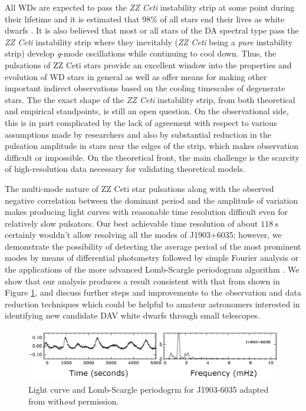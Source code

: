 \documentclass{aastex631}
\begin{document}
All WDs are expected to pass the \emph{ZZ Ceti} instability strip at
some point during their lifetime and it is estimated that 98\% of all
stars end their lives as white dwarfs \citep{Catelan_2015}. It is also
believed that most or all stars of the DA spectral type pass the
\emph{ZZ Ceti} instability strip where they inevitably (\emph{ZZ Ceti}
being a \emph{pure} instability strip) develop \emph{g}-mode
oscillations while continuing to cool down. Thus, the pulsations of ZZ
Ceti stars provide an excellent window into the properties and
evolution of WD stars in general as well as offer means for making
other important indirect observations based on the cooling timescales
of degenerate stars. The the exact shape of the \emph{ZZ Ceti}
instability strip, from both theoretical and empirical standpoints, is
still an open question. On the observational side, this is in part
complicated by the lack of agreement with respect to various
assumptions made by researchers and also by substantial reduction in
the pulsation amplitude in stars near the edges of the strip, which
makes observation difficult or impossible. On the theoretical front,
the main challenge is the scarcity of high-resolution data necessary
for validating theoretical models.

The multi-mode nature of ZZ Ceti star pulsations along with the
observed negative correlation between the dominant period and the
amplitude of variation \citep{Vincent_2020} makes producing light
curves with reasonable time resolution difficult even for relatively
slow pulsators. Our best achievable time resolution of about
\(\SI{118}{\second}\) certainly wouldn't allow resolving all the modes
of J1903+6035; however, we demonstrate the possibility of detecting
the average period of the most prominent modes by means of
differential photometry followed by simple Fourier analysis or the
applications of the more advanced Lomb-Scargle periodogram algorithm
\citep{VanderPlas_2018}. We show that our analysis produces a result
consistent with that from \citet{Vincent_2020} shown in Figure
\ref{fig:vincent}, and discuss further steps and improvements to the
observation and data reduction techniques which could be helpful to
amateur astronomers interested in identifying new candidate DAV white
dwarfs through small telescopes.
\begin{figure}[htbp]
\centering
\includegraphics[width=.9\linewidth]{./img/vincent_graph.png}
\caption{\label{fig:vincent}Light curve and Lomb-Scargle periodogrm
  for J1903-6035 adapted from \citet{Vincent_2020} with\emph{out}
  permission.}
\end{figure}
\end{document}
